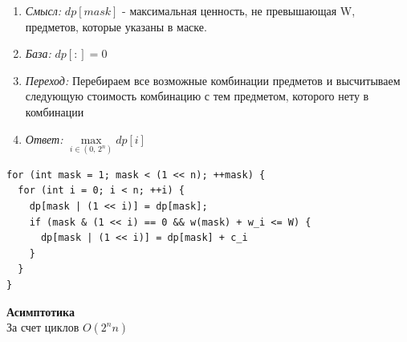 
\begin{enumerate}
    \item \textit{Смысл:} $dp[mask]$ - максимальная ценность, не превышающая W, предметов, которые указаны в маске.
    \item \textit{База:} $dp[:] = 0$
    \item \textit{Переход:} Перебираем все возможные комбинации предметов и высчитываем следующую стоимость комбинацию с тем предметом, которого нету в комбинации 
    \item \textit{Ответ:} $\max\limits_{i \in (0,\,2^n)} dp[i]$
\end{enumerate}

\begin{lstlisting}
for (int mask = 1; mask < (1 << n); ++mask) {
  for (int i = 0; i < n; ++i) {
    dp[mask | (1 << i)] = dp[mask];
    if (mask & (1 << i) == 0 && w(mask) + w_i <= W) {
      dp[mask | (1 << i)] = dp[mask] + c_i
    }
  }
}
\end{lstlisting}

\textbf{Асимптотика} \\
За счет циклов $O(2^n n)$

\pagebreak